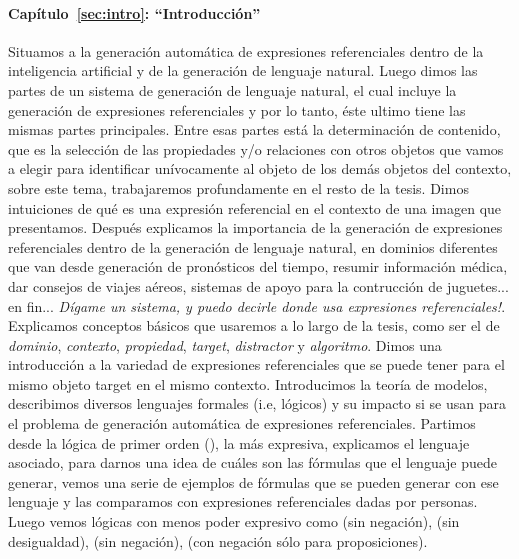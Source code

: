 \paragraph{Cap\'itulo~\ref{sec:intro}: ``Introducci\'on''} Situamos a la generaci\'on autom\'atica de expresiones 
referenciales dentro de la inteligencia artificial y de la generaci\'on de lenguaje natural. Luego dimos las partes de un sistema de 
generaci\'on de lenguaje natural, el cual incluye la generaci\'on de expresiones referenciales y por lo tanto, \'este ultimo tiene las mismas 
partes principales. Entre esas partes est\'a la determinaci\'on de contenido, que es la selecci\'on de las propiedades y/o relaciones con otros objetos que vamos a elegir 
para identificar un\'ivocamente al objeto de los dem\'as objetos del contexto, sobre este tema, trabajaremos profundamente en el resto de la 
tesis. Dimos intuiciones de qu\'e es una expresi\'on referencial en el contexto de una imagen que presentamos. Despu\'es explicamos la 
importancia de la generaci\'on de expresiones referenciales dentro de la generaci\'on de lenguaje natural, en 
dominios diferentes que van desde generaci\'on de pron\'osticos del tiempo, resumir informaci\'on m\'edica, dar consejos de viajes a\'ereos, 
sistemas de apoyo para la contrucci\'on de juguetes... en fin... {\it D\'igame un sistema, y puedo decirle donde usa expresiones 
referenciales!}. Explicamos conceptos b\'asicos que usaremos a lo largo de la tesis, como ser el de {\it dominio}, {\it contexto}, 
{\it propiedad}, {\it target}, {\it distractor} y {\it algoritmo}. Dimos una introducci\'on a la variedad de expresiones referenciales que 
se puede tener para el mismo objeto target en el mismo contexto.
Introducimos la teor\'ia de modelos, describimos diversos lenguajes formales (i.e, l\'ogicos) y su impacto si se usan para el problema de generaci\'on autom\'atica de expresiones referenciales.  Partimos desde la l\'ogica de primer orden (\FOL), la m\'as expresiva, explicamos el lenguaje asociado, para darnos una idea de cu\'ales son las f\'ormulas que el lenguaje puede generar, vemos una serie de ejemplos de f\'ormulas que se pueden generar con ese lenguaje y las comparamos con expresiones referenciales dadas por personas. Luego vemos l\'ogicas con menos poder expresivo como \EPFOL (\FOL sin negaci\'on), \ALC (\FOL sin desigualdad), \EL(\ALC sin negaci\'on), \ELAN (\ALC con negaci\'on s\'olo para proposiciones).

